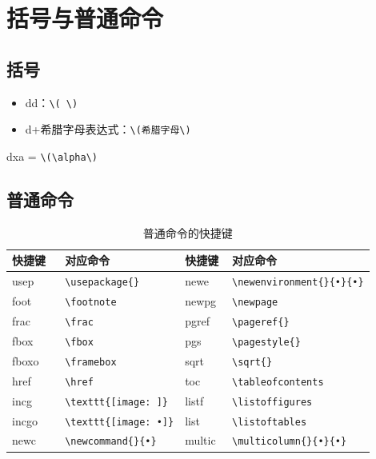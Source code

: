 \documentclass[geye,green,pad,cn]{elegantnote}
\begin{document}
\section{括号与普通命令}

\subsection{括号}

\begin{itemize}
\item dd：\lstinline{\( \)}
\item d+希腊字母表达式：\lstinline{\(希腊字母\)}
\end{itemize}

\begin{example}
dxa = \lstinline{\(\alpha\)}
\end{example}


\subsection{普通命令}
\begin{table}[htbp]
  \centering
  \caption{普通命令的快捷键}
    \begin{tabular}{p{3.04em}lp{3.5em}l}
    \toprule
    快捷键 & 对应命令  & 快捷键 & 对应命令 \\
    \midrule
    usep    & \lstinline|\usepackage{}| & newe   & \lstinline|\newenvironment{}{•}{•}| \\
    foot     & \lstinline|\footnote| & newpg  & \lstinline|\newpage| \\
    frac     & \lstinline|\frac| & pgref   & \lstinline|\pageref{}| \\
    fbox    & \lstinline|\fbox| & pgs    & \lstinline|\pagestyle{}| \\
    fboxo   & \lstinline|\framebox| & sqrt    & \lstinline|\sqrt{}| \\
    href    & \lstinline|\href| & toc    & \lstinline|\tableofcontents| \\
    incg    & \lstinline|\texttt{[image: ]}| & listf    & \lstinline|\listoffigures| \\
    incgo   & \lstinline|\texttt{[image: •]}| & list    & \lstinline|\listoftables| \\
    newc   & \lstinline|\newcommand{}{•}| & multic  & \lstinline|\multicolumn{}{•}{•}| \\
    \bottomrule
    \end{tabular}%
  \label{tab:normal command}%
\end{table}%
\end{document}
